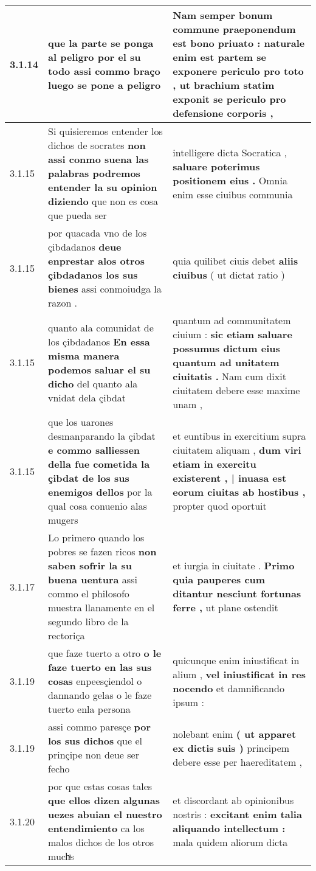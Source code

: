 \begin{tabular}{|p{1cm}|p{6.5cm}|p{6.5cm}|}
3.1.14 & que la parte se ponga al peligro \textbf{ por el su todo } assi commo braço luego se pone a peligro & Nam semper bonum commune praeponendum est bono priuato : \textbf{ naturale enim est partem se exponere periculo pro toto , } ut brachium statim exponit se periculo pro defensione corporis , \\\hline
3.1.15 & Si quisieremos entender los dichos de socrates \textbf{ non assi conmo suena las palabras podremos entender la su opinion diziendo } que non es cosa que pueda ser & intelligere dicta Socratica , \textbf{ saluare poterimus positionem eius . } Omnia enim esse ciuibus communia \\\hline
3.1.15 & por quacada vno de los çibdadanos \textbf{ deue enprestar alos otros çibdadanos los sus bienes } assi conmoiudga la razon . & quia quilibet ciuis debet \textbf{ aliis ciuibus } ( ut dictat ratio ) \\\hline
3.1.15 & quanto ala comunidat de los çibdadanos \textbf{ En essa misma manera podemos saluar el su dicho } del quanto ala vnidat dela çibdat & quantum ad communitatem ciuium : \textbf{ sic etiam saluare possumus dictum eius quantum ad unitatem ciuitatis . } Nam cum dixit ciuitatem debere esse maxime unam , \\\hline
3.1.15 & que los uarones desmanparando la çibdat \textbf{ e commo salliessen della fue cometida la çibdat de los sus enemigos dellos } por la qual cosa conuenio alas mugers & et euntibus in exercitium supra ciuitatem aliquam , \textbf{ dum viri etiam in exercitu existerent , | inuasa est eorum ciuitas ab hostibus , } propter quod oportuit \\\hline
3.1.17 & Lo primero quando los pobres se fazen ricos \textbf{ non saben sofrir la su buena uentura } assi commo el philosofo muestra llanamente en el segundo libro de la rectoriça & et iurgia in ciuitate . \textbf{ Primo quia pauperes cum ditantur nesciunt fortunas ferre , } ut plane ostendit \\\hline
3.1.19 & que faze tuerto a otro \textbf{ o le faze tuerto en las sus cosas } enpeesçiendol o dannando gelas o le faze tuerto enla persona & quicunque enim iniustificat in alium , \textbf{ vel iniustificat in res nocendo } et damnificando ipsum : \\\hline
3.1.19 & assi commo paresçe \textbf{ por los sus dichos } que el prinçipe non deue ser fecho & nolebant enim \textbf{ ( ut apparet ex dictis suis ) } principem debere esse per haereditatem , \\\hline
3.1.20 & por que estas cosas tales \textbf{ que ellos dizen algunas uezes abuian el nuestro entendimiento } ca los malos dichos de los otros muchͣs & et discordant ab opinionibus nostris : \textbf{ excitant enim talia aliquando intellectum : } mala quidem aliorum dicta \\\hline

\end{tabular}
